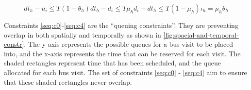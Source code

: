 \documentclass[ee,msthesis]{usuthesis}
\begin{document}
\begin{multicols}{2}
\begin{subequations}
  \begin{equation}
      \label{seq:c14}
      dt_h - u_i \le T(1 - \theta_h)
  \end{equation}
  \begin{equation}
      \label{seq:c15}
      dt_h - d_i \le T\mu_h
  \end{equation}
  \begin{equation}
      \label{seq:c16}
      d_i - dt_h \le T(1 - \mu_h)
  \end{equation}
  \begin{equation}
      \label{seq:c17}
      \iota_h = \mu_h \theta_h
  \end{equation}
\end{subequations}
\label{eq:constraints}
\end{multicols}

Constraints \ref{seq:c0}-\ref{seq:c4} are the ``queuing constraints''. They are preventing overlap in both spatially and
temporally as shown in \ref{fig:spacial-and-temporal-constr}. The y-axis represents the possible queues for a bus visit to be
placed into, and the x-axis represents the time that can be reserved for each visit. The shaded rectangles represent
time that has been scheduled, and the queue allocated for each bus visit. The set of constraints \ref{seq:c0} -
\ref{seq:c4} aim to ensure that these shaded rectangles never overlap.
\end{document}
